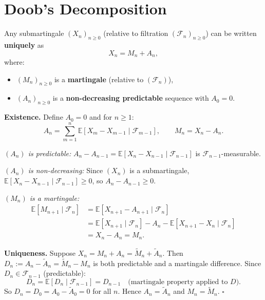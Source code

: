 \documentclass[12pt]{article}
\newcommand{\E}{\mathbb{E}}
\newcommand{\F}{\mathcal{F}}
\newcommand{\1}{\mathbf{1}}
\begin{document}
\section{Doob's Decomposition}

\begin{tcolorbox}[redbox={Theorem: Doob's Decomposition}]
Any submartingale $(X_n)_{n \ge 0}$ (relative to filtration $(\F_n)_{n \ge 0}$)
can be written \textbf{uniquely} as
\[
  X_n = M_n + A_n,
\]
where:
\begin{itemize}
  \item $(M_n)_{n \ge 0}$ is a \textbf{martingale} (relative to $(\F_n)$),
  \item $(A_n)_{n \ge 0}$ is a \textbf{non-decreasing predictable} sequence with $A_0 = 0$.
\end{itemize}
\end{tcolorbox}

\begin{tcolorbox}[redbox={Proof of Doob's Decomposition}]
\textbf{Existence.}  Define $A_0 = 0$ and for $n \ge 1$:
\[
  A_n = \sum_{m=1}^n \E[X_m - X_{m-1} \mid \F_{m-1}], \qquad
  M_n = X_n - A_n.
\]

\textit{$(A_n)$ is predictable:} $A_n - A_{n-1} = \E[X_n - X_{n-1} \mid \F_{n-1}]$
is $\F_{n-1}$-measurable.

\textit{$(A_n)$ is non-decreasing:} Since $(X_n)$ is a submartingale,
$\E[X_n - X_{n-1} \mid \F_{n-1}] \ge 0$, so $A_n - A_{n-1} \ge 0$.

\textit{$(M_n)$ is a martingale:}
\begin{align*}
  \E[M_{n+1} \mid \F_n]
  &= \E[X_{n+1} - A_{n+1} \mid \F_n] \\
  &= \E[X_{n+1} \mid \F_n] - A_n - \E[X_{n+1} - X_n \mid \F_n] \\
  &= X_n - A_n = M_n.
\end{align*}

\medskip\noindent
\textbf{Uniqueness.}  Suppose $X_n = M_n + A_n = \widetilde{M}_n + \widetilde{A}_n$.
Then $D_n := A_n - \widetilde{A}_n = \widetilde{M}_n - M_n$ is both predictable
and a martingale difference.  Since $D_n \in \F_{n-1}$ (predictable):
\[
  D_n = \E[D_n \mid \F_{n-1}] = D_{n-1}
  \quad \text{(martingale property applied to $D$)}.
\]
So $D_n = D_0 = A_0 - \widetilde{A}_0 = 0$ for all $n$.  Hence $A_n = \widetilde{A}_n$
and $M_n = \widetilde{M}_n$. \hfill$\square$
\end{tcolorbox}
\end{document}
